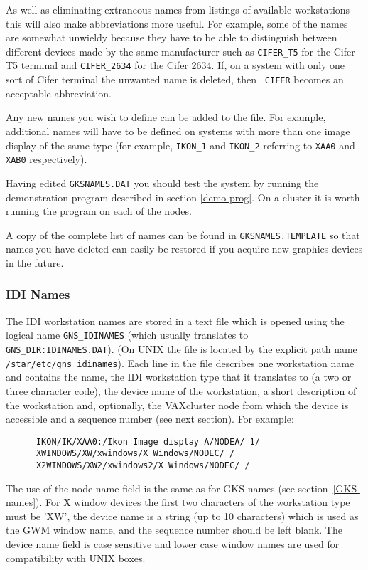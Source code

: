 As well as eliminating extraneous names from listings of available workstations
this will also make abbreviations more useful. For example, some of the 
names are somewhat unwieldy because they have to be able to distinguish between
different devices made by the same manufacturer such as {\tt CIFER\_T5} for the
Cifer T5 terminal and {\tt CIFER\_2634} for the Cifer 2634. If, on a system with
only one sort of Cifer terminal the unwanted name is deleted, then {\tt
CIFER} becomes an acceptable abbreviation.

Any new names you wish to define can be added to the file. For example,
additional names will have to be defined on systems with more than one image
display of the same type (for example, {\tt IKON\_1} and {\tt IKON\_2}
referring to {\tt XAA0} and {\tt XAB0} respectively).

Having edited {\tt GKSNAMES.DAT} you should test the system by running the
demonstration program described in section \ref{demo-prog}. On a cluster
it is worth running the program on each of the nodes.

A copy of the complete list of names can be found in {\tt GKSNAMES.TEMPLATE} so
that names you have deleted can easily be restored if you acquire new graphics
devices in the future.

\subsubsection{IDI Names}

The IDI workstation names are stored in a text file which is opened using the
logical name {\tt GNS\_IDINAMES} (which usually translates to {\tt
GNS\_DIR:IDINAMES.DAT}). (On UNIX the file is located by the explicit
path name {\tt /star/etc/gns\_idinames}).
Each line in the file describes one workstation name
and contains the name, the IDI workstation type that it translates to (a two
or three character code), the
device name of the workstation, a short description of the workstation and,
optionally, the VAXcluster node from which the device is accessible and a
sequence number (see next section). For example:
\begin{verbatim}
      IKON/IK/XAA0:/Ikon Image display A/NODEA/ 1/
      XWINDOWS/XW/xwindows/X Windows/NODEC/ /
      X2WINDOWS/XW2/xwindows2/X Windows/NODEC/ /
\end{verbatim}
The use of the node name field is the same as for GKS names
(see section~\ref{GKS-names}). For X window devices the first two characters
of the workstation type must be 'XW', the device name is a string (up to
10 characters) which is used as the GWM window name, and the sequence
number should be left blank. The device name field is case sensitive and
lower case window names are used for compatibility with UNIX boxes.

